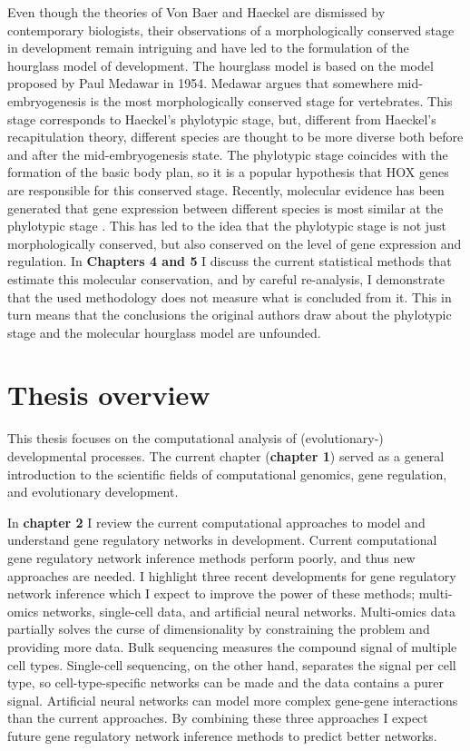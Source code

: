 Even though the theories of Von Baer and Haeckel are dismissed by contemporary biologists, their observations of a morphologically conserved stage in development remain intriguing and have led to the formulation of the hourglass model of development. The hourglass model is based on the model proposed by Paul Medawar in 1954\cite{Medawar1954}. Medawar argues that somewhere mid-embryogenesis is the most morphologically conserved stage for vertebrates. This stage corresponds to Haeckel's phylotypic stage, but, different from Haeckel's recapitulation theory, different species are thought to be more diverse both before and after the mid-embryogenesis state. The phylotypic stage coincides with the formation of the basic body plan, so it is a popular hypothesis that HOX genes are responsible for this conserved stage\cite{Duboule1994}. Recently, molecular evidence has been generated that gene expression between different species is most similar at the phylotypic stage \cite{Levin2016,marletaz2018,Mayshar2023,Liu2021,DomazetLoso2010,Irie2011,Kalinka2010,Piasecka2013,Uesaka2019}. This has led to the idea that the phylotypic stage is not just morphologically conserved, but also conserved on the level of gene expression and regulation. In \textbf{Chapters 4 and 5} I discuss the current statistical methods that estimate this molecular conservation, and by careful re-analysis, I demonstrate that the used methodology does not measure what is concluded from it. This in turn means that the conclusions the original authors draw about the phylotypic stage and the molecular hourglass model are unfounded. 

\section{Thesis overview}

This thesis focuses on the computational analysis of (evolutionary-) developmental processes. The current chapter (\textbf{chapter 1}) served as a general introduction to the scientific fields of computational genomics, gene regulation, and evolutionary development.  

In \textbf{chapter 2} I review the current computational approaches to model and understand gene regulatory networks in development. Current computational gene regulatory network inference methods perform poorly, and thus new approaches are needed. I highlight three recent developments for gene regulatory network inference which I expect to improve the power of these methods; multi-omics networks, single-cell data, and artificial neural networks. Multi-omics data partially solves the curse of dimensionality by constraining the problem and providing more data. Bulk sequencing measures the compound signal of multiple cell types. Single-cell sequencing, on the other hand, separates the signal per cell type, so cell-type-specific networks can be made and the data contains a purer signal. Artificial neural networks can model more complex gene-gene interactions than the current approaches. By combining these three approaches I expect future gene regulatory network inference methods to predict better networks.

